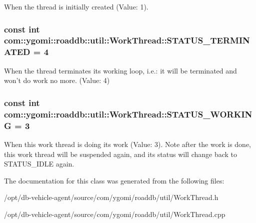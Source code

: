 When the thread is initially created (Value\-: 1). \hypertarget{classcom_1_1ygomi_1_1roaddb_1_1util_1_1WorkThread_a936330c526d2a547c63831d9596acb53}{
\subsubsection[{S\-T\-A\-T\-U\-S\-\_\-\-T\-E\-R\-M\-I\-N\-A\-T\-E\-D}]{\setlength{\rightskip}{0pt plus 5cm}const int com\-::ygomi\-::roaddb\-::util\-::\-Work\-Thread\-::\-S\-T\-A\-T\-U\-S\-\_\-\-T\-E\-R\-M\-I\-N\-A\-T\-E\-D = 4\hspace{0.3cm}{\ttfamily [static]}}}\label{classcom_1_1ygomi_1_1roaddb_1_1util_1_1WorkThread_a936330c526d2a547c63831d9596acb53}
When the thread terminates its working loop, i.\-e.\-: it will be terminated and won't do work no more. (Value\-: 4) \hypertarget{classcom_1_1ygomi_1_1roaddb_1_1util_1_1WorkThread_a7db27d123b3e2f4c5512bad8cbb67aee}{
\subsubsection[{S\-T\-A\-T\-U\-S\-\_\-\-W\-O\-R\-K\-I\-N\-G}]{\setlength{\rightskip}{0pt plus 5cm}const int com\-::ygomi\-::roaddb\-::util\-::\-Work\-Thread\-::\-S\-T\-A\-T\-U\-S\-\_\-\-W\-O\-R\-K\-I\-N\-G = 3\hspace{0.3cm}{\ttfamily [static]}}}\label{classcom_1_1ygomi_1_1roaddb_1_1util_1_1WorkThread_a7db27d123b3e2f4c5512bad8cbb67aee}
When this work thread is doing its work (Value\-: 3). Note after the work is done, this work thread will be suspended again, and its status will change back to S\-T\-A\-T\-U\-S\-\_\-\-I\-D\-L\-E again. 

The documentation for this class was generated from the following files\-:\begin{DoxyCompactItemize}
\item 
/opt/db-\/vehicle-\/agent/source/com/ygomi/roaddb/util/Work\-Thread.\-h\item 
/opt/db-\/vehicle-\/agent/source/com/ygomi/roaddb/util/Work\-Thread.\-cpp\end{DoxyCompactItemize}
